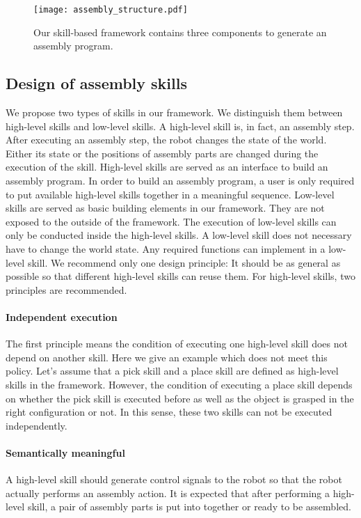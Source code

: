 \begin{figure}[!htbp]
\centering
\texttt{[image: assembly\_structure.pdf]}
\captionsetup{justification=raggedright}
\caption{Our skill-based framework contains three components to generate an assembly program.}
\label{fig:assembly_structure}       %
\end{figure} 

\subsection{Design of assembly skills}
We propose two types of skills in our framework. We distinguish them between high-level skills and low-level skills.  A high-level skill is, in fact, an assembly step. After executing an assembly step, the robot changes the state of the world. Either its state or the positions of assembly parts are changed during the execution of the skill. High-level skills are served as an interface to  build an assembly program. In order to build an assembly program, a user is only required to put available high-level skills together in a meaningful sequence. Low-level skills are served as basic building elements in our framework. They are not exposed to the outside of the framework. The execution of low-level skills can only be conducted inside the high-level skills. A low-level skill does not necessary have to change the world state. Any required functions can implement in a low-level skill. We recommend only one design principle: It should be as general as possible so that different high-level skills can reuse them. For high-level skills, two principles are recommended. 
\paragraph{Independent execution}
The first principle means the condition of executing one high-level skill does not depend on another skill. Here we give an example which does not meet this policy. Let's assume that a pick skill and a place skill are defined as high-level skills in the framework. However, the condition of executing a place skill depends on whether the pick skill is executed before as well as the object is grasped in the right configuration or not. In this sense, these two skills can not be executed independently. 
 
\paragraph{Semantically meaningful}
A high-level skill should generate control signals to the robot so that the robot actually performs an assembly action. It is expected that after performing a high-level skill, a pair of assembly parts is put into together or ready to be assembled.
 
